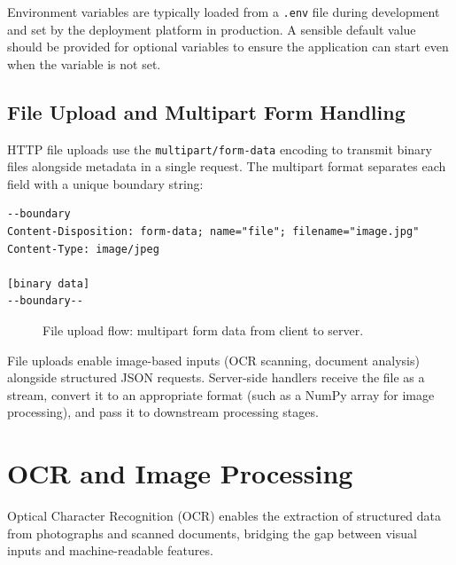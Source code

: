 \documentclass[10pt,a4paper]{article}
\begin{document}
Environment variables are typically loaded from a \texttt{.env} file during development and set by the deployment platform in production. A sensible default value should be provided for optional variables to ensure the application can start even when the variable is not set.

\subsection{File Upload and Multipart Form Handling}
\label{sec:file-upload}

HTTP file uploads use the \texttt{multipart/form-data} encoding to transmit binary files alongside metadata in a single request. The multipart format separates each field with a unique boundary string:

\begin{lstlisting}[basicstyle=\ttfamily\small]
--boundary
Content-Disposition: form-data; name="file"; filename="image.jpg"
Content-Type: image/jpeg

[binary data]
--boundary--
\end{lstlisting}

\begin{figure}[H]
    \centering
    \caption{File upload flow: multipart form data from client to server.}
    \label{fig:file-upload-flow}
\end{figure}

File uploads enable image-based inputs (OCR scanning, document analysis) alongside structured JSON requests. Server-side handlers receive the file as a stream, convert it to an appropriate format (such as a NumPy array for image processing), and pass it to downstream processing stages.

\section{OCR and Image Processing}
\label{sec:ocr}

Optical Character Recognition (OCR) enables the extraction of structured data from photographs and scanned documents, bridging the gap between visual inputs and machine-readable features.
\end{document}
